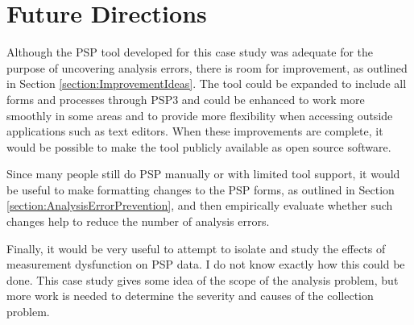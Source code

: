 \section{Future Directions} 

Although the PSP tool developed for this case study was adequate for the
purpose of uncovering analysis errors, there is room for improvement, as
outlined in Section \ref{section:ImprovementIdeas}.  The tool could be
expanded to include all forms and processes through PSP3 and could be
enhanced to work more smoothly in some areas and to provide more
flexibility when accessing outside applications such as text editors.
When these improvements are complete, it would be possible to make the tool 
publicly available as open source software.

Since many people still do PSP manually or with limited tool support, it
would be useful to make formatting changes to the PSP forms, as outlined in 
Section \ref{section:AnalysisErrorPrevention}, and then empirically
evaluate whether such changes help to reduce the number of analysis errors.

\newpage
Finally, it would be very useful to attempt to isolate and study the
effects of measurement dysfunction on PSP data.  I do not know exactly how
this could be done.  This case study gives some idea of the scope of the
analysis problem, but more work is needed to determine the severity and
causes of the collection problem.



 




